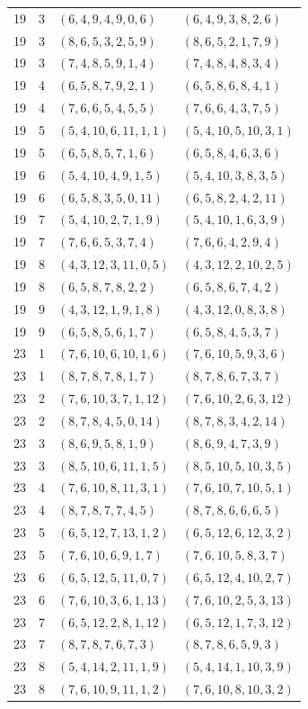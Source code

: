 \begin{longtable}{rrll}
19&3&$(6,4,9,4,9,0,6)$&$(6,4,9,3,8,2,6)$\\
19&3&$(8,6,5,3,2,5,9)$&$(8,6,5,2,1,7,9)$\\
19&3&$(7,4,8,5,9,1,4)$&$(7,4,8,4,8,3,4)$\\
19&4&$(6,5,8,7,9,2,1)$&$(6,5,8,6,8,4,1)$\\
19&4&$(7,6,6,5,4,5,5)$&$(7,6,6,4,3,7,5)$\\
19&5&$(5,4,10,6,11,1,1)$&$(5,4,10,5,10,3,1)$\\
19&5&$(6,5,8,5,7,1,6)$&$(6,5,8,4,6,3,6)$\\
19&6&$(5,4,10,4,9,1,5)$&$(5,4,10,3,8,3,5)$\\
19&6&$(6,5,8,3,5,0,11)$&$(6,5,8,2,4,2,11)$\\
19&7&$(5,4,10,2,7,1,9)$&$(5,4,10,1,6,3,9)$\\
19&7&$(7,6,6,5,3,7,4)$&$(7,6,6,4,2,9,4)$\\
19&8&$(4,3,12,3,11,0,5)$&$(4,3,12,2,10,2,5)$\\
19&8&$(6,5,8,7,8,2,2)$&$(6,5,8,6,7,4,2)$\\
19&9&$(4,3,12,1,9,1,8)$&$(4,3,12,0,8,3,8)$\\
19&9&$(6,5,8,5,6,1,7)$&$(6,5,8,4,5,3,7)$\\
23&1&$(7,6,10,6,10,1,6)$&$(7,6,10,5,9,3,6)$\\
23&1&$(8,7,8,7,8,1,7)$&$(8,7,8,6,7,3,7)$\\
23&2&$(7,6,10,3,7,1,12)$&$(7,6,10,2,6,3,12)$\\
23&2&$(8,7,8,4,5,0,14)$&$(8,7,8,3,4,2,14)$\\
23&3&$(8,6,9,5,8,1,9)$&$(8,6,9,4,7,3,9)$\\
23&3&$(8,5,10,6,11,1,5)$&$(8,5,10,5,10,3,5)$\\
23&4&$(7,6,10,8,11,3,1)$&$(7,6,10,7,10,5,1)$\\
23&4&$(8,7,8,7,7,4,5)$&$(8,7,8,6,6,6,5)$\\
23&5&$(6,5,12,7,13,1,2)$&$(6,5,12,6,12,3,2)$\\
23&5&$(7,6,10,6,9,1,7)$&$(7,6,10,5,8,3,7)$\\
23&6&$(6,5,12,5,11,0,7)$&$(6,5,12,4,10,2,7)$\\
23&6&$(7,6,10,3,6,1,13)$&$(7,6,10,2,5,3,13)$\\
23&7&$(6,5,12,2,8,1,12)$&$(6,5,12,1,7,3,12)$\\
23&7&$(8,7,8,7,6,7,3)$&$(8,7,8,6,5,9,3)$\\
23&8&$(5,4,14,2,11,1,9)$&$(5,4,14,1,10,3,9)$\\
23&8&$(7,6,10,9,11,1,2)$&$(7,6,10,8,10,3,2)$\\

\end{longtable}
